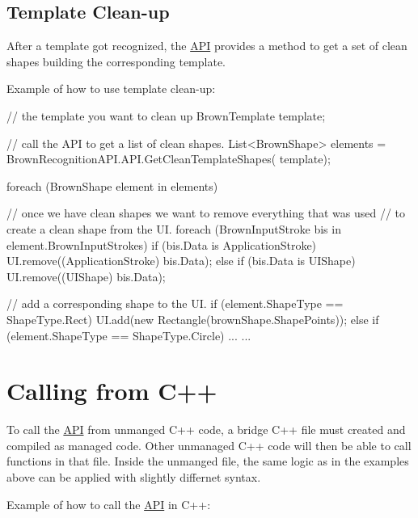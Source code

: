 \hypertarget{index_ad}{}\subsection{\-Template Clean-\/up}\label{index_ad}
\-After a template got recognized, the \hyperlink{class_brown_recognition_a_p_i_1_1_a_p_i}{\-A\-P\-I} provides a method to get a set of clean shapes building the corresponding template. \par
 \par
 \-Example of how to use template clean-\/up\-: 
\begin{DoxyCode}
 // the template you want to clean up
 BrownTemplate template; 
 
 // call the API to get a list of clean shapes. 
 List<BrownShape> elements = BrownRecognitionAPI.API.GetCleanTemplateShapes(
      template);
 
 foreach (BrownShape element in elements) {
     // once we have clean shapes we want to remove everything that was used
     // to create a clean shape from the UI. 
     foreach (BrownInputStroke bis in element.BrownInputStrokes) {
         if (bis.Data is ApplicationStroke) {
             UI.remove((ApplicationStroke) bis.Data);
         }
         else if (bis.Data is UIShape) {
             UI.remove((UIShape) bis.Data);
         }
     }
     
     // add a corresponding shape to the UI.
     if (element.ShapeType == ShapeType.Rect) {
         UI.add(new Rectangle(brownShape.ShapePoints));
     }
     else if (element.ShapeType == ShapeType.Circle) {
         ...
     }
     ...
 }
\end{DoxyCode}
\hypertarget{index_b}{}\section{\-Calling from C++}\label{index_b}
\-To call the \hyperlink{class_brown_recognition_a_p_i_1_1_a_p_i}{\-A\-P\-I} from unmanged \-C++ code, a bridge \-C++ file must created and compiled as managed code. \-Other unmanaged \-C++ code will then be able to call functions in that file. \-Inside the unmanged file, the same logic as in the examples above can be applied with slightly differnet syntax. \par
 \par
 \-Example of how to call the \hyperlink{class_brown_recognition_a_p_i_1_1_a_p_i}{\-A\-P\-I} in \-C++\-: 
